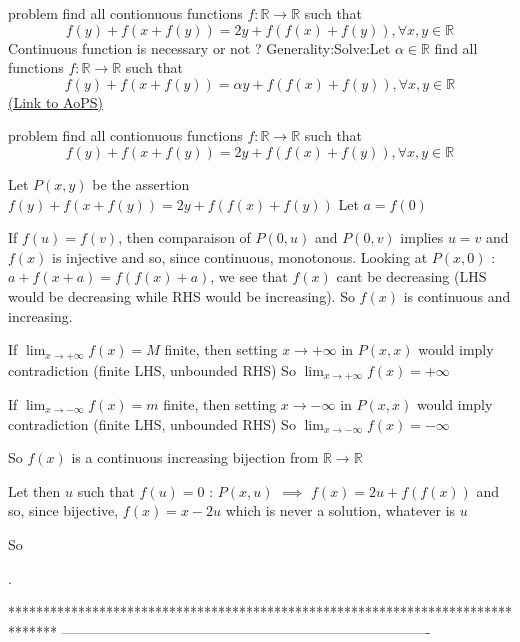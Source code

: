 \begin{problem}
	problem find all  contionuous functions ${f:\mathbb{R}}\to\mathbb{R}$ such that
\[f(y)+f(x+f(y))=2y+f(f(x)+f(y)),\forall x,y\in\mathbb{R}\]
Continuous function is necessary or not ?
Generality:Solve:Let $\alpha\in\mathbb{R}$ find all   functions ${f:\mathbb{R}}\to\mathbb{R}$ such that
\[f(y)+f(x+f(y))=\alpha y+f(f(x)+f(y)),\forall x,y\in\mathbb{R}\]
	\flushright \href{https://artofproblemsolving.com/community/c6h530729}{(Link to AoPS)}
\end{problem}



\begin{solution}
	\begin{tcolorbox}problem find all  contionuous functions ${f:\mathbb{R}}\to\mathbb{R}$ such that
\[f(y)+f(x+f(y))=2y+f(f(x)+f(y)),\forall x,y\in\mathbb{R}\]\end{tcolorbox}
Let $P(x,y)$ be the assertion $f(y)+f(x+f(y))=2y+f(f(x)+f(y))$
Let $a=f(0)$

If $f(u)=f(v)$, then comparaison of $P(0,u)$ and $P(0,v)$ implies $u=v$ and $f(x)$ is injective and so, since continuous, monotonous.
Looking at $P(x,0)$ : $a+f(x+a)=f(f(x)+a)$, we see that $f(x)$ cant be decreasing (LHS would be decreasing while RHS would be increasing).
So $f(x)$ is continuous and increasing.

If $\lim_{x\to+\infty}f(x)=M$ finite, then setting $x\to+\infty$ in $P(x,x)$ would imply contradiction (finite LHS, unbounded RHS)
So $\lim_{x\to+\infty}f(x)=+\infty$

If $\lim_{x\to-\infty}f(x)=m$ finite, then setting $x\to-\infty$ in $P(x,x)$ would imply contradiction (finite LHS, unbounded RHS)
So $\lim_{x\to-\infty}f(x)=-\infty$

So $f(x)$ is a continuous increasing bijection from $\mathbb R\to\mathbb R$

Let then $u$ such that $f(u)=0$ : $P(x,u)$ $\implies$ $f(x)=2u+f(f(x))$ and so, since bijective, $f(x)=x-2u$ which is never a solution, whatever is $u$

So .
\end{solution}
*******************************************************************************
-------------------------------------------------------------------------------

